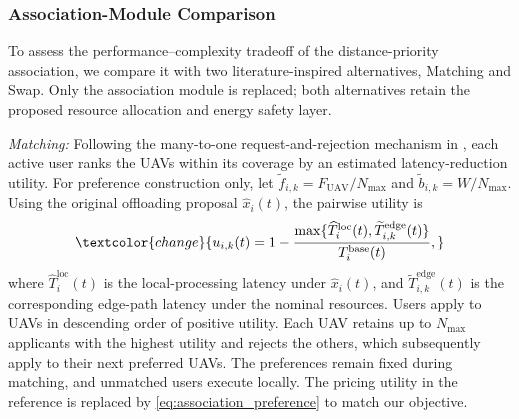 \subsubsection{\textcolor{change}{Association-Module Comparison}}
\textcolor{change}{
To assess the performance--complexity tradeoff of the distance-priority
association, we compare it with two literature-inspired alternatives,
Matching and Swap. Only the association module is replaced; both
alternatives retain the proposed resource allocation and energy safety layer.
}

\textcolor{change}{
\emph{Matching:} Following the many-to-one request-and-rejection mechanism
in \cite{sun2024twotimescale}, each active user ranks the UAVs within its
coverage by an estimated latency-reduction utility. For preference
construction only, let $\tilde f_{i,k}=F_{\mathrm{UAV}}/N_{\max}$ and
$\tilde b_{i,k}=W/N_{\max}$. Using the original offloading proposal
$\hat x_i(t)$, the pairwise utility is
}
\begin{equation}
\textcolor{change}{
 u_{i,k}(t)=1-
 \frac{\max\{\widehat T_i^{\mathrm{loc}}(t),
                   \widetilde T_{i,k}^{\mathrm{edge}}(t)\}}
      {T_i^{\mathrm{base}}(t)},
}
\label{eq:association_preference}
\end{equation}
\textcolor{change}{
where $\widehat T_i^{\mathrm{loc}}(t)$ is the local-processing latency
under $\hat x_i(t)$, and $\widetilde T_{i,k}^{\mathrm{edge}}(t)$ is the
corresponding edge-path latency under the nominal resources.
Users apply to UAVs in descending order of positive utility. Each UAV
retains up to $N_{\max}$ applicants with the highest utility and rejects
the others, which subsequently apply to their next preferred UAVs.
The preferences remain fixed during matching, and unmatched users
execute locally. The pricing utility in the reference is replaced by
\eqref{eq:association_preference} to match our objective.
}


